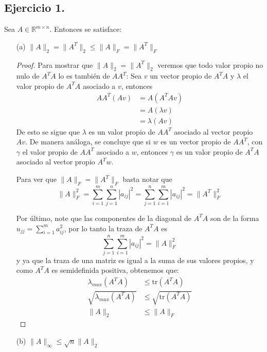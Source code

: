 
\subsection*{Ejercicio 1.}
Sea $A \in \mathbb{R}^{m \times n}$. Entonces se satisface:

\begin{enumerate}
    \item[(a)] $\|A\|_2 = \|A^T\|_2 \leq \|A\|_F = \|A^T\|_F$\\ 

    \begin{proof}
    Para mostrar que $\|A\|_2 = \|A^T\|_2$ veremos que todo valor propio no nulo de $A^TA$ lo es también de $AA^T$: Sea $v$ un vector propio de $A^TA$ y $\lambda$ el valor propio de $A^TA$ asociado a $v$, entonces
    \begin{align*}
    AA^T(Av) &= A(A^TAv) \\ 
        & = A(\lambda v) \\ 
        & = \lambda (Av) 
    \end{align*}
    De esto se sigue que $\lambda$ es un valor propio de $AA^T$ asociado al vector propio $Av$. De manera análoga, se concluye que si $w$ es un vector propio de $AA^T$, con $\gamma$ el valor propio de $AA^T$ asociado a $w$, entonces $\gamma$ es un valor propio de $A^TA$ asociado al vector propio $A^Tw$.

    Para ver que $\|A\|_F = \|A^T\|_F$ basta notar que
    \[
    \|A\|_F^2=\sum_{i=1}^{m} \sum_{j=1}^{n} |a_{ij}|^2 = \sum_{j=1}^{n} \sum_{i=1}^m |a_{ij}|^2=\|A^T\|_F^2
    \]

    Por último, note que las componentes de la diagonal de $A^TA$ son de la forma $\displaystyle{u_{jj}=\sum_{i=1}^m a_{ij}^2}$, por lo tanto la traza de $A^TA$ es
    \[
    \sum_{j=1}^n\sum_{i=1}^{m}|a_{ij}|^2=\|A\|_F^2
    \]
    y ya que la traza de una matriz es igual a la suma de sus valores propios, y como $A^TA$ es semidefinida positiva, obtenemos que: 
    \begin{align*}
    \lambda_{max}(A^TA)&\leq \text{tr}(A^TA) \\
    \sqrt{\lambda_{max}(A^TA)} & \leq \sqrt{\text{tr}(A^TA)}\\ 
    \|A\|_2\ & \leq \|A\|_F
    \end{align*}
    \end{proof}
    \item[(b)] $\|A\|_\infty \leq \sqrt{n} \|A\|_2$\\ 


\end{enumerate}
